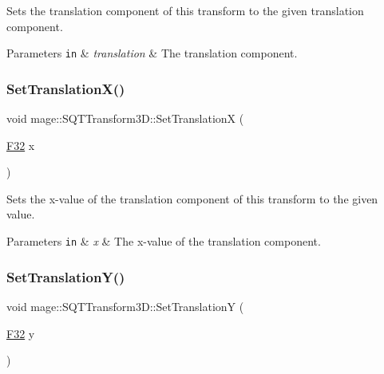 Sets the translation component of this transform to the given translation component.


\begin{DoxyParams}[1]{Parameters}
\mbox{\tt in}  & {\em translation} & The translation component. \\
\hline
\end{DoxyParams}
\mbox{\label{classmage_1_1_s_q_t_transform3_d_a748346ca904abc45fde66973ee7d892c}} 
\subsubsection{\texorpdfstring{Set\+Translation\+X()}{SetTranslationX()}}
{\footnotesize\ttfamily void mage\+::\+S\+Q\+T\+Transform3\+D\+::\+Set\+TranslationX (\begin{DoxyParamCaption}\item[{\mbox{\hyperlink{namespacemage_aa97e833b45f06d60a0a9c4fc22ae02c0}{F32}}}]{x }\end{DoxyParamCaption})\hspace{0.3cm}{\ttfamily [noexcept]}}

Sets the x-\/value of the translation component of this transform to the given value.


\begin{DoxyParams}[1]{Parameters}
\mbox{\tt in}  & {\em x} & The x-\/value of the translation component. \\
\hline
\end{DoxyParams}
\mbox{\label{classmage_1_1_s_q_t_transform3_d_aef6eee9fdae2cc2f21c8af11f43f407a}} 
\subsubsection{\texorpdfstring{Set\+Translation\+Y()}{SetTranslationY()}}
{\footnotesize\ttfamily void mage\+::\+S\+Q\+T\+Transform3\+D\+::\+Set\+TranslationY (\begin{DoxyParamCaption}\item[{\mbox{\hyperlink{namespacemage_aa97e833b45f06d60a0a9c4fc22ae02c0}{F32}}}]{y }\end{DoxyParamCaption})\hspace{0.3cm}{\ttfamily [noexcept]}}

